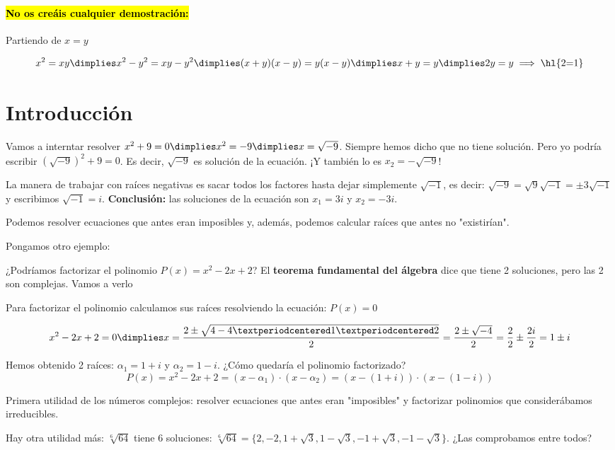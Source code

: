
\paragraph{\hl{No os creáis cualquier demostración:}}
Partiendo de $x=y$

\[
x^2 = xy \dimplies x^2-y^2 = xy-y^2 \dimplies (x+y)(x-y) = y(x-y) \dimplies x+y = y \dimplies 2y = y \implies \text{\hl{2=1}}
\]




\section{Introducción} 
Vamos a interntar resolver $x^2 + 9 = 0 \dimplies x^2 = -9 \dimplies x=\sqrt{-9}$. Siempre hemos dicho que no tiene solución. Pero yo podría escribir $(\sqrt{-9})^2 + 9 = 0$. Es decir, $\sqrt{-9}$ es solución de la ecuación. ¡Y también lo es $x_2=-\sqrt{-9}$!

La manera de trabajar con raíces negativas es sacar todos los factores hasta dejar simplemente $\sqrt{-1}$, es decir: $\sqrt{-9} = \sqrt{9}\sqrt{-1} = \pm3\sqrt{-1}$ y escribimos $\sqrt{-1} = i$. \textbf{Conclusión:} las soluciones de la ecuación son $x_1 = 3i$ y $x_2 = -3i$.

Podemos resolver ecuaciones que antes eran imposibles y, además, podemos calcular raíces que antes no "existirían".


Pongamos otro ejemplo:


¿Podríamos factorizar el polinomio $P(x) = x^2-2x+2$? El \textbf{teorema fundamental del álgebra} dice que tiene 2 soluciones, pero las 2 son complejas. Vamos a verlo

Para factorizar el polinomio calculamos sus raíces resolviendo la ecuación: $P(x) = 0$

\[x^2-2x+2 = 0 \dimplies x=\frac{2\pm\sqrt{4-4·1·2}}{2} = \frac{2\pm\sqrt{-4}}{2} = \frac{2}{2} \pm \frac{2i}{2} = 1\pm i\]

Hemos obtenido 2 raíces: $α_1 = 1+i$ y $α_2 = 1-i$. ¿Cómo quedaría el polinomio factorizado? \[P(x) = x^2-2x+2 = (x-α_1)·(x-α_2) = (x-(1+i))·(x-(1-i))\]

Primera utilidad de los números complejos: resolver ecuaciones que antes eran "imposibles" y factorizar polinomios que considerábamos irreducibles.

Hay otra utilidad más: $\sqrt[6]{64}$ tiene 6 soluciones: $\sqrt[6]{64} = \{ 2,-2,1+\sqrt{3},1-\sqrt{3},-1+\sqrt{3},-1-\sqrt{3}\}$. ¿Las comprobamos entre todos?

